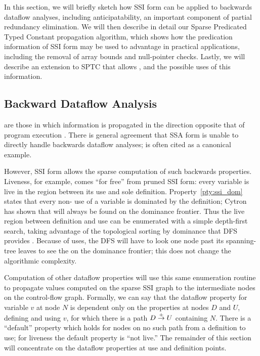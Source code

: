 \documentclass[12pt,titlepage,twoside]{article}
\begin{document}
In this section, we will briefly sketch how SSI form can be applied to
backwards dataflow analyses, including anticipatability, an important
component of partial redundancy elimination.  We will then describe in
detail our Sparse Predicated Typed Constant propagation algorithm,
which shows how the predication information of SSI form may be used to
advantage in practical applications, including the removal of array
bounds and null-pointer checks.  Lastly, we will describe an extension
to SPTC that allows , and the possible uses
of this information.

\subsection{Backward Dataflow Analysis}
 are those in which information is
propagated in the direction opposite that of program execution
\cite{offner95}.  There is general agreement
\cite{johnson93:dfg,ferrante91:pruned,weise94:vdg}
that SSA form is unable to directly handle backwards dataflow
analyses;  is often cited as a canonical example.

However, SSI form allows the sparse computation of such backwards
properties.  Liveness, for example, comes ``for free'' from pruned SSI
form: every variable is live in the region between its use and
sole definition.  Property~\ref{pty:ssi_dom} states that every
non-\phifunction{} use of a variable is dominated by the definition;
Cytron \cite{cytron91:ssa} has shown that  will always be
found on the dominance frontier.  Thus the live region between
definition and use can be enumerated with a simple depth-first search,
taking advantage of the topological sorting by dominance that DFS
provides \cite{offner95}.  Because of \phifunction{} uses, the DFS
will have to look one node past its spanning-tree leaves to see the
 on the dominance frontier; this does not change the
algorithmic complexity.

Computation of other dataflow properties will use this same
enumeration routine to propagate values computed on the sparse SSI
graph to the intermediate nodes on the control-flow graph.  Formally,
we can say that the dataflow property for variable $v$ at node $N$ is
dependent only on the properties at nodes $D$ and $U$, defining and
using $v$, for which there is a path $D\stackrel{+}{\rightarrow} U$ containing $N$.
There is a ``default'' property which holds for nodes on no such path
from a definition to use; for liveness the default property is ``not
live.''  The remainder of this section will concentrate on the
dataflow properties at use and definition points.
\end{document}
